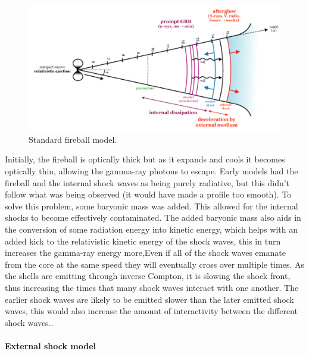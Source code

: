 \begin{figure}[h]
\begin{center}
\includegraphics[scale=0.2]{Figures/fig6.png}
\caption{Standard fireball model.}
\end{center}
\end{figure}
Initially, the fireball is optically thick but as it expands and cools it becomes optically thin, allowing the gamma-ray photons to escape. Early models had the fireball and the internal shock waves as being purely radiative, but this didn't follow what was being observed (it would have made a profile too smooth). To solve this problem, some baryonic mass was added. This allowed for the internal shocks to become effectively contaminated. The added baryonic mass also aids in the conversion of some radiation energy into kinetic energy, which helps with an added kick to the relativistic kinetic energy of the shock waves, this in turn increases the gamma-ray energy more,Even if all of the shock waves emanate from the core at the same speed they will eventually cross over multiple times. As the shells are emitting through inverse Compton, it is slowing the shock front, thus increasing the times that many shock waves interact with one another. The earlier shock waves are likely to be emitted slower than the later emitted shock waves, this would also increase the amount of interactivity between the different shock waves.\citep{10}\citep{18}.\\\\
\textbf{External shock model}\\
